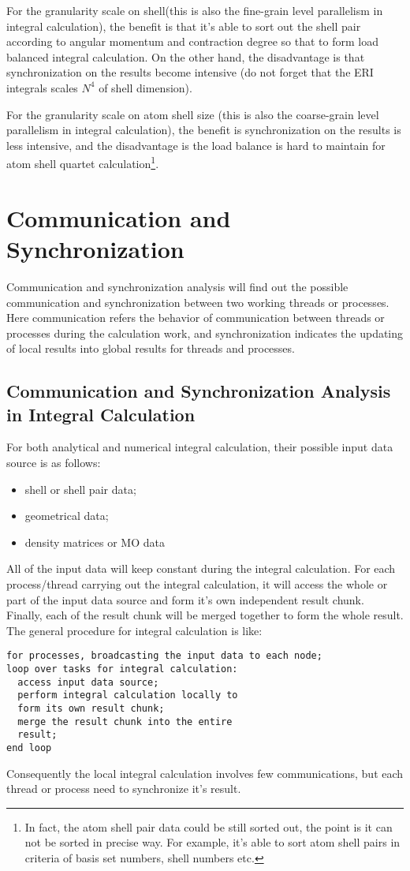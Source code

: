 For the granularity scale on shell(this is also the fine-grain level parallelism in
integral calculation), the benefit is that it's able to sort out the 
shell pair according to angular momentum and contraction degree so that 
to form load balanced integral calculation. On the other hand, the disadvantage 
is that synchronization on the results become intensive (do not forget that the 
ERI integrals scales $N^{4}$ of shell dimension).

For the granularity scale on atom shell size (this is also the coarse-grain level 
parallelism in integral calculation), the benefit is synchronization on the results
is less intensive, and the disadvantage is the load balance is hard to maintain
for atom shell quartet calculation\footnote{In fact, the atom shell pair data could
be still sorted out, the point is it can not be sorted in precise way. For example,
it's able to sort atom shell pairs in criteria of basis set numbers, shell numbers etc.}.

\section{Communication and Synchronization}
%
%
Communication and synchronization analysis will find out the possible communication
and synchronization between two working threads or processes. Here communication
refers the behavior of communication between threads or processes during the calculation
work, and synchronization indicates the updating of local results into global results 
for threads and processes.

\subsection{Communication and Synchronization Analysis in Integral Calculation}

For both analytical and numerical integral calculation, their possible input 
data source is as follows:
\begin{itemize}
 \item shell or shell pair data;
 \item geometrical data;
 \item density matrices or MO data
\end{itemize}
All of the input data will keep constant during the integral calculation. 
For each process/thread carrying out the integral calculation, it will 
access the whole or part of the input data source and form it's own independent
result chunk. Finally, each of the result chunk will be merged together to 
form the whole result. The general procedure for integral calculation is like:
\begin{verbatim}
for processes, broadcasting the input data to each node;
loop over tasks for integral calculation:
  access input data source;
  perform integral calculation locally to
  form its own result chunk;
  merge the result chunk into the entire
  result;
end loop
\end{verbatim}
Consequently the local integral calculation involves few communications, but each
thread or process need to synchronize it's result.

